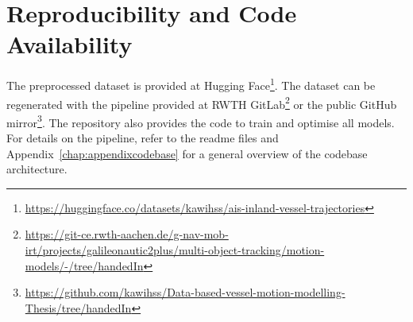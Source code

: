         \section{Reproducibility and Code Availability }
        
        The preprocessed dataset is provided at Hugging Face\footnote{\url{https://huggingface.co/datasets/kawihss/ais-inland-vessel-trajectories}}. 
        The dataset can be regenerated with the pipeline provided at RWTH GitLab\footnote{\url{https://git-ce.rwth-aachen.de/g-nav-mob-irt/projects/galileonautic2plus/multi-object-tracking/motion-models/-/tree/handedIn}} or the public GitHub mirror\footnote{\url{https://github.com/kawihss/Data-based-vessel-motion-modelling-Thesis/tree/handedIn}}. 
        The repository also provides the code to train and optimise all models. For details on the pipeline, refer to the readme files and Appendix~\ref{chap:appendixcodebase} for a general overview of the codebase architecture.
        

    
